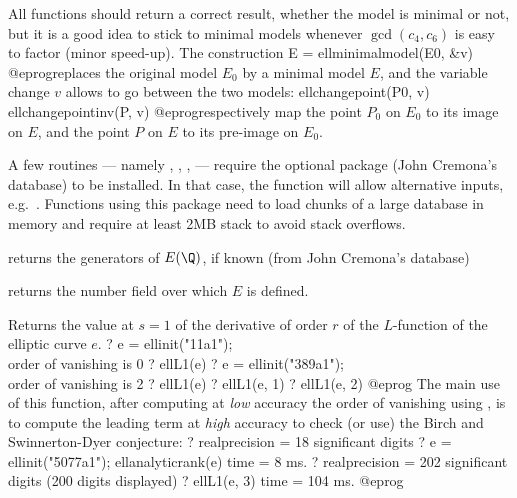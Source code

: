 All functions should return a correct result, whether the model is minimal or
not, but it is a good idea to stick to minimal models whenever
$\gcd(c_4,c_6)$ is easy to factor (minor speed-up). The construction
\bprog
  E = ellminimalmodel(E0, &v)
@eprog\noindent replaces the original model $E_0$ by a minimal model $E$,
and the variable change $v$ allows to go between the two models:
\bprog
  ellchangepoint(P0, v)
  ellchangepointinv(P, v)
@eprog\noindent respectively map the point $P_0$ on $E_0$ to its image on
$E$, and the point $P$ on $E$ to its pre-image on $E_0$.

A few routines --- namely , ,
,  --- require the optional package 
(John Cremona's database) to be installed. In that case, the function
 will allow alternative inputs, e.g.~.
Functions using this package need to load chunks of a large database in
memory and require at least 2MB stack to avoid stack overflows.

\item {} returns the generators of $E(\Q)$, if known (from John
  Cremona's database)


\item {} returns the number field over which $E$ is defined.



\label{se:ellL1}
Returns the value at $s=1$ of the derivative of order $r$ of the
$L$-function of the elliptic curve $e$.
\bprog
? e = ellinit("11a1"); \\ order of vanishing is 0
? ellL1(e)
? e = ellinit("389a1");  \\ order of vanishing is 2
? ellL1(e)
? ellL1(e, 1)
? ellL1(e, 2)
@eprog\noindent
The main use of this function, after computing at \emph{low} accuracy the
order of vanishing using , is to compute the
leading term at \emph{high} accuracy to check (or use) the Birch and
Swinnerton-Dyer conjecture:
\bprog
? 
  realprecision = 18 significant digits
? e = ellinit("5077a1"); ellanalyticrank(e)
time = 8 ms.
? 
  realprecision = 202 significant digits (200 digits displayed)
? ellL1(e, 3)
time = 104 ms.
@eprog

